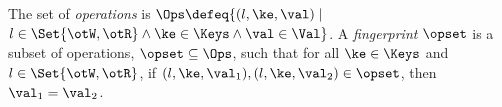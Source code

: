 \begin{definition}[Fingerprints]
The set of \emph{operations} is
$\Ops \defeq \{(l, \ke, \val) \mid$ $ l \in \Set{\otW, \otR} \land \ke \in \Keys \wedge \val \in \Val \}$.
A \emph{fingerprint} $\opset$ is a subset of operations, $\opset \subseteq \Ops$,
such that for all $\ke \in \Keys$ and \( l \in \Set{\otW, \otR} \),
if $(l, \ke, \val_1), (l, \ke, \val_2) \in \opset$, then $\val_1 = \val_2$.
\end{definition}







